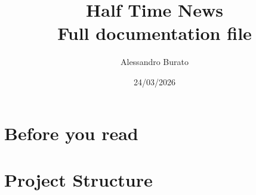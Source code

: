 \documentclass[11pt,a4paper]{article}
\title{\textbf{Half Time News}\\
\large Full documentation file}
\author{Alessandro Burato}
\date{24/03/2026}
\newcommand{\folder}{Chapters/} %
\begin{document}
\maketitle
\tableofcontents
\newpage

\section{Before you read}


\section{Project Structure}

\end{document}
